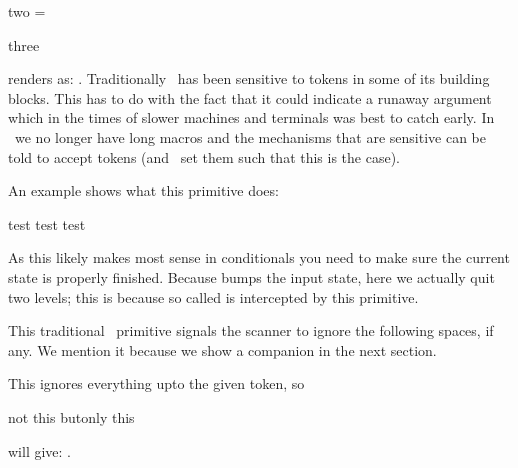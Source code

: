 two = \ignorepars \par
three
\stopbuffer

\typebuffer

renders as: \inlinebuffer. Traditionally \TEX\ has been sensitive to 
tokens in some of its building blocks. This has to do with the fact that it could
indicate a runaway argument which in the times of slower machines and terminals
was best to catch early. In \LUAMETATEX\ we no longer have long macros and the
mechanisms that are sensitive can be told to accept  tokens (and
\CONTEXT\ set them such that this is the case).

\stopnewprimitive

\startnewprimitive[title={\prm {ignorerest}}]

An example shows what this primitive does:

\startbuffer
\tolerant\def\foo[#1]#*[#2]%
  {1234
   \ifparameter#1\or\else
     \expandafter\ignorerest
   \fi
   /#1/
   \ifparameter#2\or\else
     \expandafter\ignorerest
   \fi
   /#2/ }

\foo test \foo[456] test \foo[456][789] test
\stopbuffer

\typebuffer

As this likely makes most sense in conditionals you need to make sure the current
state is properly finished. Because  bumps the input state,
here we actually quit two levels; this is because so called  is intercepted by this primitive.

\getbuffer

\stopnewprimitive

\startoldprimitive[title={\prm {ignorespaces}}]

This traditional \TEX\ primitive signals the scanner to ignore the following
spaces, if any. We mention it because we show a companion in the next section.

\stopoldprimitive

\startnewprimitive[title={\prm {ignoreupto}}]

This ignores everything upto the given token, so

\startbuffer
\ignoreupto \foo not this but\foo only this
\stopbuffer

\typebuffer

will give: \inlinebuffer .

\stopnewprimitive

\startoldprimitive[title={\prm {immediate}}]

